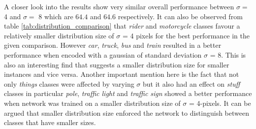 A closer look into the results show very similar overall performance between $\sigma =$ 4 and $\sigma =$ 8 which are $64.4$ and $64.6$ respectively. It can also be observed from table \ref{tab:distribution_comparison} that \textit{rider} and \textit{motorcycle} classes favour a relatively smaller distribution size of $\sigma$ = 4 pixels for the best performance in the given comparison. However \textit{car}, \textit{truck}, \textit{bus} and \textit{train} resulted in a better performance when encoded with a gaussian of standard deviation $\sigma$ = 8.  This is also an interesting find that suggests a smaller distribution size for smaller instances and vice versa. Another important mention here is the fact that not only \textit{things} classes were affected by varying $\sigma$ but it also had an effect on \textit{stuff} classes in particular \textit{pole}, \textit{traffic light} and \textit{traffic sign} showed a better performance when network was trained on a smaller distribution size of $\sigma$ = 4-pixels. It can be argued that smaller distribution size enforced the network to distinguish between classes that have smaller sizes. 



